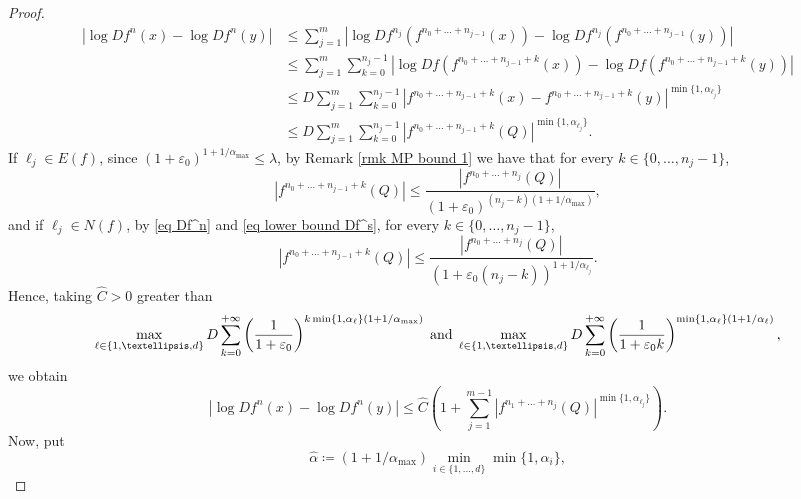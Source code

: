 \documentclass[10pt,a4paper]{amsart}
\numberwithin{equation}{section} %
\numberwithin{figure}{section} %
\renewcommand{\=}{\coloneqq}
\begin{document}
\begin{proof}
    \begin{equation*}
    \begin{split}
        |\log Df^n(x) - \log Df^n(y)| &\leq \sum_{j=1}^{m} |\log Df^{n_j}(f^{n_0+\ldots+n_{j-1}}(x)) - \log Df^{n_j}(f^{n_0+\ldots+n_{j-1}}(y))|\\
        &\leq  \sum_{j=1}^m \sum_{k=0}^{n_j -1}|\log Df(f^{n_0+\ldots+n_{j-1} + k}(x)) - \log Df(f^{n_0+\ldots+n_{j-1} + k}(y))|\\
        &\leq D\sum_{j=1}^{m}\sum_{k=0}^{n_j-1} |f^{n_0+\ldots+n_{j-1} + k}(x) - f^{n_0+\ldots+n_{j-1} + k}(y)|^{\min\{1,\alpha_{\ell_j}\}}\\
        &\leq D\sum_{j=1}^{m}\sum_{k=0}^{n_j-1} |f^{n_0+\ldots+n_{j-1} + k}(Q)|^{\min\{1,\alpha_{\ell_j}\}}.
        \end{split}
    \end{equation*}
    If $\ell_j\in E(f)$, since $(1+\varepsilon_0)^{1+1/\alpha_{\max}}\leq \lambda$, by Remark \ref{rmk MP bound 1} we have that for every $k\in \{0,\ldots, n_j -1\}$,
    \begin{equation}
        |f^{n_0+\ldots+n_{j-1} + k}(Q)| \leq \frac{|f^{n_0+\ldots + n_j}(Q)|}{(1+\varepsilon_0 )^{(n_j - k)(1+1/\alpha_{\max})}},
    \end{equation}
    and if $\ell_j \in N(f)$, by \eqref{eq Df^n} and \eqref{eq lower bound Df^s}, for every $k\in\{0,\ldots,n_j-1\}$,
    \begin{equation}
        |f^{n_0+\ldots+n_{j-1} + k}(Q)| \leq \frac{|f^{n_0+\ldots + n_j}(Q)|}{(1+\varepsilon_0(n_j-k) )^{1+1/\alpha_{\ell_j}}}.
    \end{equation}
    Hence, taking $\widehat{C}>0$ greater than 
    \begin{equation*}
       \max_{\ell\in\{1,\ldots,d\}}D \sum_{k=0}^{+\infty} \left(\frac{1}{1+\varepsilon_0}\right)^{k\min\{1,\alpha_{\ell}\}(1+1/\alpha_{\max})} \text{\;and\;} \max_{\ell\in\{1,\ldots,d\}}D\sum_{k=0}^{+\infty} \left(\frac{1}{1+ \varepsilon_0 k}\right)^{\min\{1,\alpha_{\ell}\}(1+1/\alpha_{\ell})},
    \end{equation*}
    we obtain
    \begin{equation}\label{eq 2 MP bound}
        |\log Df^n(x) - \log Df^n(y)| \leq \widehat{C}\left( 1 + \sum_{j=1}^{m-1} |f^{n_1+\ldots + n_j}(Q)|^{\min\{1,\alpha_{\ell_j}\}}\right).
    \end{equation}
    Now, put 
    \begin{equation*}
        \widehat{\alpha}\=  (1+1/\alpha_{\max})\min_{i\in \{1,\dots,d\}}\min\{1,\alpha_i\},

\end{equation*}
\end{proof}
\end{document}
